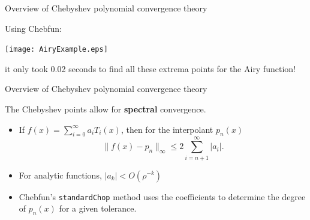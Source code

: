 \documentclass{beamer}
\begin{document}
\begin{frame}{Overview of Chebyshev polynomial convergence theory}

Using Chebfun:	
\bigskip

\begin{center}
\texttt{[image: AiryExample.eps]}
\end{center}
\begin{center}
it only took 0.02 seconds to find all these extrema points for the Airy function!	
\end{center}

\end{frame}



\begin{frame}{Overview of Chebyshev polynomial convergence theory}

The Chebyshev points allow for \textbf{spectral} convergence.

\begin{itemize}
\item If $f(x) = \sum_{i=0}^{\infty} a_i T_i(x)$, then for the interpolant $p_n(x)$ $$ \|f(x) - p_n \|_{\infty} \leq 2 \sum_{i=n+1}^{\infty} |a_i|.$$
\item For analytic functions, $|a_k|<O(\rho^{-k})$
\item Chebfun's {\tt standardChop} method uses the coefficients to determine the degree of $p_n(x)$ for a given tolerance.
\end{itemize}

\end{frame}
\end{document}
